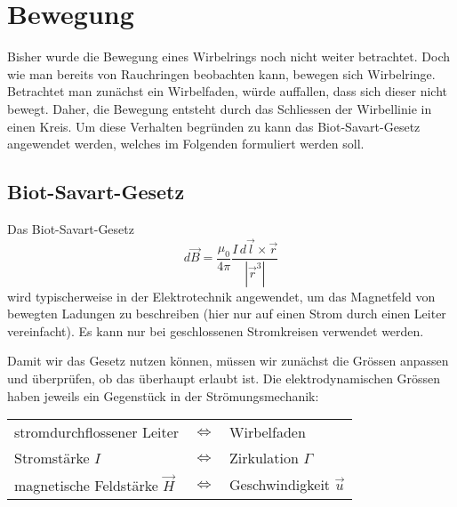 %
%
%
\section{Bewegung \label{paper:Wirbelringe:Bewegung}}

Bisher wurde die Bewegung eines Wirbelrings noch nicht weiter betrachtet. 
Doch wie man bereits von Rauchringen beobachten kann, bewegen sich Wirbelringe. 
Betrachtet man zunächst ein Wirbelfaden, würde auffallen, dass sich dieser nicht bewegt. 
Daher, die Bewegung entsteht durch das Schliessen der Wirbellinie in einen Kreis. 
Um diese Verhalten begründen zu kann das Biot-Savart-Gesetz \cite{Wirbelringe:FuehrerdurchdieStroemungslehre} angewendet werden, welches im Folgenden formuliert werden soll.

\subsection{Biot-Savart-Gesetz}

Das Biot-Savart-Gesetz
\[
d \vec{B}
=
\frac{\mu_0}{4\pi}\frac{I \,d \vec{l} \times \vec{r}}{\left\lvert \vec{r}^{3}\right\rvert }
\]  %
wird typischerweise in der Elektrotechnik angewendet, um das Magnetfeld von bewegten Ladungen zu beschreiben (hier nur auf einen Strom durch einen Leiter vereinfacht). 
Es kann nur bei geschlossenen Stromkreisen verwendet werden. 

Damit wir das Gesetz nutzen können, müssen wir zunächst die Grössen anpassen und überprüfen, ob das überhaupt erlaubt ist. 
Die elektrodynamischen Grössen haben jeweils ein Gegenstück in der Strömungsmechanik:

\begin{center}
    \begin{tabular}{lcl}
    stromdurchflossener Leiter          & \(\Leftrightarrow \) & Wirbelfaden \\
    Stromstärke \(I\)                   & \(\Leftrightarrow \) & Zirkulation \(\Gamma\) \\
    magnetische Feldstärke \(\vec{H}\)  & \(\Leftrightarrow \) & Geschwindigkeit \(\vec{u}\) \\
    \end{tabular}
\end{center}

